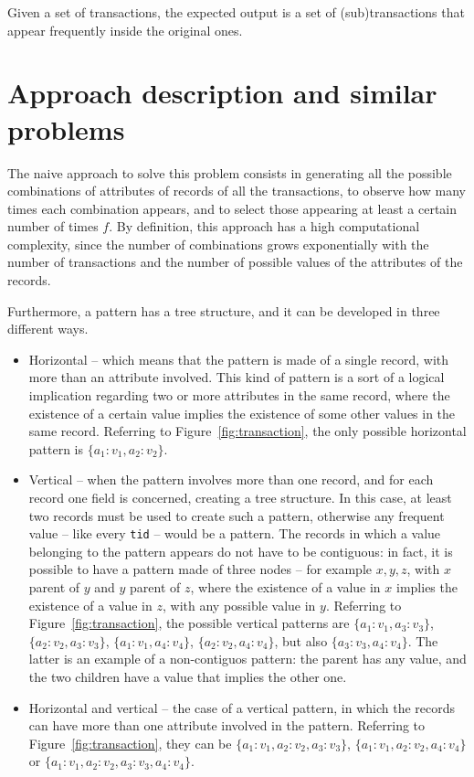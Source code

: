 \documentclass{acm_proc_article-sp-sigmod09}
\begin{document}
Given a set of transactions, the expected output is a set of (sub)transactions that appear frequently inside the original ones.

\section{Approach description and similar problems}
\label{sec:general}
The naive approach to solve this problem consists in generating all the possible combinations of attributes of records of all the transactions, to observe how many times each combination appears, and to select those appearing at least a certain number of times $f$. By definition, this approach has a high computational complexity, since the number of combinations grows exponentially with the number of transactions and the number of possible values of the attributes of the records.

Furthermore, a pattern has a tree structure, and it can be developed in three different ways.
\begin{itemize}
\item Horizontal -- which means that the pattern is made of a single record, with more than an attribute involved. This kind of pattern is a sort of a logical implication regarding two or more attributes in the same record, where the existence of a certain value implies the existence of some other values in the same record. Referring to Figure~\ref{fig:transaction}, the only possible horizontal pattern is $\{a_1 \colon v_1, a_2 \colon v_2\}$.
\item Vertical -- when the pattern involves more than one record, and for each record one field is concerned, creating a tree structure. In this case, at least two records must be used to create such a pattern, otherwise any frequent value -- like every \texttt{tid} -- would be a pattern. The records in which a value belonging to the pattern appears do not have to be contiguous: in fact, it is possible to have a pattern made of three nodes -- for example $x, y, z$, with $x$ parent of $y$ and $y$ parent of $z$, where the existence of a value in $x$ implies the existence of a value in $z$, with any possible value in $y$. Referring to Figure~\ref{fig:transaction}, the possible vertical patterns are $\{a_1 \colon v_1, a_3 \colon v_3\}$, $\{a_2 \colon v_2, a_3 \colon v_3\}$, $\{a_1 \colon v_1, a_4 \colon v_4\}$, $\{a_2 \colon v_2, a_4 \colon v_4\}$, but also $\{a_3 \colon v_3, a_4 \colon v_4\}$. The latter is an example of a non-contiguos pattern: the parent has any value, and the two children have a value that implies the other one.
\item Horizontal and vertical -- the case of a vertical pattern, in which the records can have more than one attribute involved in the pattern. Referring to Figure~\ref{fig:transaction}, they can be $\{a_1 \colon v_1, a_2 \colon v_2, a_3 \colon v_3\}$, $\{a_1 \colon v_1, a_2 \colon v_2, a_4 \colon v_4\}$ or $\{a_1 \colon v_1, a_2 \colon v_2, a_3 \colon v_3, a_4 \colon v_4\}$.
\end{itemize}
\end{document}
